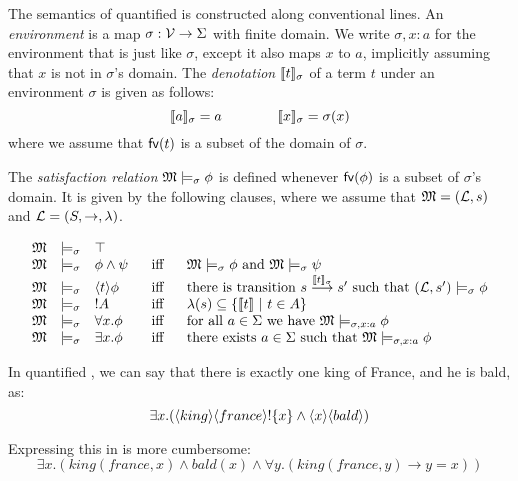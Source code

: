 \begin{definition}
The semantics of quantified \cathoristic{} is constructed along
conventional lines. An \emph{environment} is a map $\sigma : \mathcal{V}
\rightarrow \Sigma$ with finite domain.  We write $\sigma, x : a$ for
the environment that is just like $\sigma$, except it also maps $x$ to
$a$, implicitly assuming that $x$ is not in $\sigma$'s domain.  The
\emph{denotation} $\lbrack\!\lbrack t \rbrack\!\rbrack_{\sigma}$ of a term $t$ under an
environment $\sigma$ is given as follows:
\[
   \lbrack\!\lbrack a \rbrack\!\rbrack_{\sigma} = a
      \qquad\qquad
   \lbrack\!\lbrack x \rbrack\!\rbrack_{\sigma} = \sigma(x)
\]
where we assume that $\mathsf{fv}(t)$ is a subset of the domain of $\sigma$.

The \emph{satisfaction
  relation} $\frak{M} \models_{\sigma} \phi$ is defined whenever
$\mathsf{fv}(\phi)$ is a subset of $\sigma$'s domain. It is given by the
following clauses, where we assume that $\frak{M} = (\mathcal{L}, s)$ and $\mathcal{L} =
(S, \rightarrow, \lambda)$.

\[
\begin{array}{lclcl}
  \MMM & \models_{\sigma} & \top   \\
  \MMM & \models_{\sigma} & \phi \AND \psi &\ \mbox{ iff } \ & \MMM  \models_{\sigma} \phi \mbox { and } \MMM \models_{\sigma} \psi  \\
  \MMM & \models_{\sigma} & \langle t \rangle \phi & \mbox{ iff } & \text{there is transition } s \TRANS{\SEMB{t}_{\sigma}} s' \mbox { such that } (\LLL, s') \models_{\sigma} \phi  \\
  \MMM & \models_{\sigma} & \fBang A &\mbox{ iff } & \lambda(s) \subseteq \{\SEMB{t}\ |\ t \in A\} \\
  \MMM & \models_{\sigma} & \forall x.\phi &\mbox{ iff } & \text{for all} \ a \in \Sigma\ \text{we have}\ \MMM \models_{\sigma, x : a} \phi \\
  \MMM & \models_{\sigma} & \exists x.\phi &\mbox{ iff } & \text{there exists} \ a \in \Sigma \ \text{such that}\  \MMM \models_{\sigma, x : a} \phi
\end{array}
\]


\end{definition}

\NI In quantified \cathoristic{}, we can say that there is exactly one
king of France, and he is bald, as:
\[
   \exists x . (\langle king \rangle \langle france \rangle ! \{x\} \land \langle x \rangle \langle bald \rangle )
\]

\NI Expressing this in \fol{} is more cumbersome:
\[
   \exists x. ( \mathit{king}(\mathit{france}, x) \land \mathit{bald}(x) \land \forall y. ( \mathit{king}(\mathit{france}, y) \rightarrow y = x ))
\]

